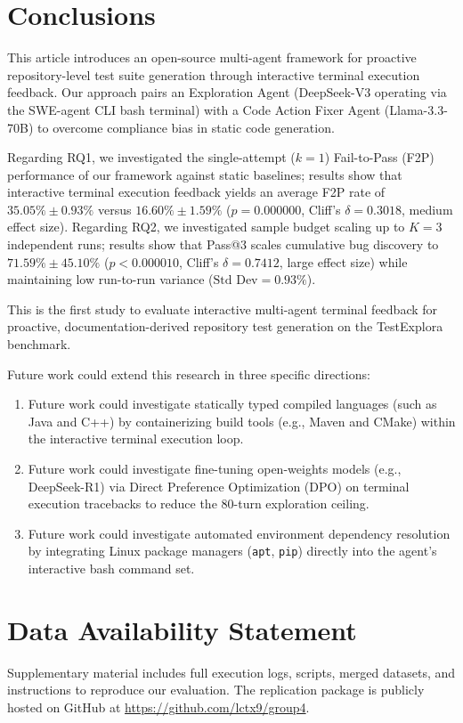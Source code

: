 \section{Conclusions}
\label{sec:conclusion}

This article introduces an open-source multi-agent framework for proactive repository-level test suite generation through interactive terminal execution feedback. Our approach pairs an Exploration Agent (DeepSeek-V3 operating via the SWE-agent CLI bash terminal) with a Code Action Fixer Agent (Llama-3.3-70B) to overcome compliance bias in static code generation.

Regarding RQ1, we investigated the single-attempt ($k=1$) Fail-to-Pass (F2P) performance of our framework against static baselines; results show that interactive terminal execution feedback yields an average F2P rate of $35.05\% \pm 0.93\%$ versus $16.60\% \pm 1.59\%$ ($p = 0.000000$, Cliff's $\delta = 0.3018$, medium effect size). Regarding RQ2, we investigated sample budget scaling up to $K=3$ independent runs; results show that Pass@3 scales cumulative bug discovery to $71.59\% \pm 45.10\%$ ($p < 0.000010$, Cliff's $\delta = 0.7412$, large effect size) while maintaining low run-to-run variance ($\text{Std Dev} = 0.93\%$).

This is the first study to evaluate interactive multi-agent terminal feedback for proactive, documentation-derived repository test generation on the TestExplora benchmark.

Future work could extend this research in three specific directions:
\begin{enumerate}
    \item Future work could investigate statically typed compiled languages (such as Java and C++) by containerizing build tools (e.g., Maven and CMake) within the interactive terminal execution loop.
    \item Future work could investigate fine-tuning open-weights models (e.g., DeepSeek-R1) via Direct Preference Optimization (DPO) on terminal execution tracebacks to reduce the 80-turn exploration ceiling.
    \item Future work could investigate automated environment dependency resolution by integrating Linux package managers (\texttt{apt}, \texttt{pip}) directly into the agent's interactive bash command set.
\end{enumerate}

\section*{Data Availability Statement}
Supplementary material includes full execution logs, scripts, merged datasets, and instructions to reproduce our evaluation. The replication package is publicly hosted on GitHub at \url{https://github.com/lctx9/group4}.

